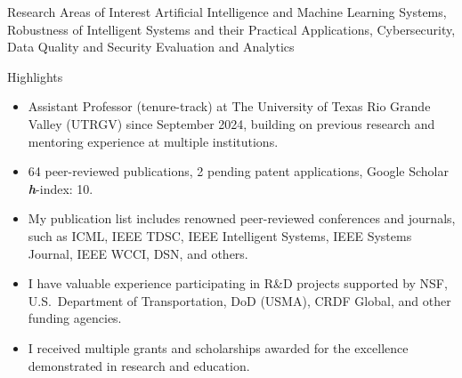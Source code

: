 \documentclass[10pt]{resume} %
\begin{document}
\vspace{-0.3cm}


\begin{rSection}{Research Areas of Interest}
      Artificial Intelligence and Machine Learning Systems, Robustness of Intelligent Systems and their Practical Applications, Cybersecurity, Data Quality and Security Evaluation and Analytics
\end{rSection}

\begin{rSection}{Highlights}
\begin{itemize}
\itemsep-0.5em
    \item Assistant Professor (tenure-track) at The University of Texas Rio Grande Valley (UTRGV) since September 2024, building on previous research and mentoring experience at multiple institutions.
    \item 64 peer-reviewed publications, 2 pending patent applications, Google Scholar \textit{\textbf{h}}-index: 10.
    \item My publication list includes renowned peer-reviewed conferences and journals, such as ICML, IEEE TDSC, IEEE Intelligent Systems, IEEE Systems Journal, IEEE WCCI, DSN, and others.
    \item I have valuable experience participating in R\&D projects supported by NSF, U.S.\ Department of Transportation, DoD (USMA), CRDF Global, and other funding agencies.
    \item I received multiple grants and scholarships awarded for the excellence demonstrated in research and education.
\end{itemize} 
\end{rSection}
\end{document}
